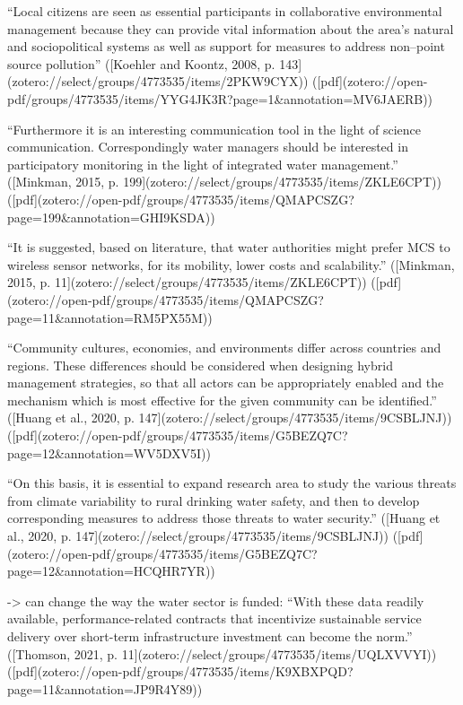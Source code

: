 “Local citizens are seen as essential participants in collaborative environmental management because they can provide vital information about the area’s natural and sociopolitical systems as well as support for measures to address non–point source pollution” ([Koehler and Koontz, 2008, p. 143](zotero://select/groups/4773535/items/2PKW9CYX)) ([pdf](zotero://open-pdf/groups/4773535/items/YYG4JK3R?page=1&annotation=MV6JAERB))


“Furthermore it is an interesting communication tool in the light of science communication. Correspondingly water managers should be interested in participatory monitoring in the light of integrated water management.” ([Minkman, 2015, p. 199](zotero://select/groups/4773535/items/ZKLE6CPT)) ([pdf](zotero://open-pdf/groups/4773535/items/QMAPCSZG?page=199&annotation=GHI9KSDA))

“It is suggested, based on literature, that water authorities might prefer MCS to wireless sensor networks, for its mobility, lower costs and scalability.” ([Minkman, 2015, p. 11](zotero://select/groups/4773535/items/ZKLE6CPT)) ([pdf](zotero://open-pdf/groups/4773535/items/QMAPCSZG?page=11&annotation=RM5PX55M))

“Community cultures, economies, and environments differ across countries and regions. These differences should be considered when designing hybrid management strategies, so that all actors can be appropriately enabled and the mechanism which is most effective for the given community can be identified.” ([Huang et al., 2020, p. 147](zotero://select/groups/4773535/items/9CSBLJNJ)) ([pdf](zotero://open-pdf/groups/4773535/items/G5BEZQ7C?page=12&annotation=WV5DXV5I))

“On this basis, it is essential to expand research area to study the various threats from climate variability to rural drinking water safety, and then to develop corresponding measures to address those threats to water security.” ([Huang et al., 2020, p. 147](zotero://select/groups/4773535/items/9CSBLJNJ)) ([pdf](zotero://open-pdf/groups/4773535/items/G5BEZQ7C?page=12&annotation=HCQHR7YR))

-> can change the way the water sector is funded: “With these data readily available, performance-related contracts that incentivize sustainable service delivery over short-term infrastructure investment can become the norm.” ([Thomson, 2021, p. 11](zotero://select/groups/4773535/items/UQLXVVYI)) ([pdf](zotero://open-pdf/groups/4773535/items/K9XBXPQD?page=11&annotation=JP9R4Y89))


